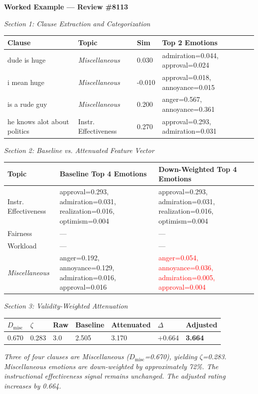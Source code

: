 \documentclass{article}
\begin{document}
\thispagestyle{empty}

\noindent\textbf{Worked Example — Review \#8113}

\vspace{0.5em}
\noindent\textit{Section 1: Clause Extraction and Categorization}

\vspace{0.3em}
\noindent
\begin{tabular}{p{7cm} p{3.5cm} p{1cm} p{5.5cm}}
\toprule
\textbf{Clause} & \textbf{Topic} & \textbf{Sim} & \textbf{Top 2 Emotions} \\
\midrule
dude is huge & \textit{Miscellaneous} & 0.030 & admiration=0.044, approval=0.024 \\
\addlinespace
i mean huge & \textit{Miscellaneous} & -0.010 & approval=0.018, annoyance=0.015 \\
\addlinespace
is a rude guy & \textit{Miscellaneous} & 0.200 & anger=0.567, annoyance=0.361 \\
\addlinespace
he knows alot about politics & Instr. Effectiveness & 0.270 & approval=0.293, admiration=0.031 \\
\bottomrule
\end{tabular}

\vspace{0.8em}
\noindent\textit{Section 2: Baseline vs. Attenuated Feature Vector}

\vspace{0.3em}
\noindent
\begin{tabular}{p{3.5cm} p{7cm} p{7cm}}
\toprule
\textbf{Topic} & \textbf{Baseline Top 4 Emotions} & \textbf{Down-Weighted Top 4 Emotions}  \\
\midrule
Instr. Effectiveness & approval=0.293, admiration=0.031, realization=0.016, optimism=0.004 & approval=0.293, admiration=0.031, realization=0.016, optimism=0.004 \\
\addlinespace
Fairness & — & — \\
\addlinespace
Workload & — & — \\
\addlinespace
\textit{Miscellaneous} & anger=0.192, annoyance=0.129, admiration=0.016, approval=0.016 & \textcolor{red}{anger=0.054, annoyance=0.036, admiration=0.005, approval=0.004} \\
\bottomrule
\end{tabular}

\vspace{0.8em}
\noindent\textit{Section 3: Validity-Weighted Attenuation}

\vspace{0.3em}
\noindent
\begin{tabular}{p{2cm} p{2cm} p{2cm} p{2.5cm} p{2.5cm} p{2cm} p{2.5cm}}
\toprule
$D_{\text{misc}}$ & $\zeta$ & \textbf{Raw} & \textbf{Baseline} & \textbf{Attenuated} & $\Delta$ & \textbf{Adjusted} \\
\midrule
0.670 & 0.283 & 3.0 & 2.505 & 3.170 & +0.664 & \textbf{3.664} \\
\bottomrule
\end{tabular}

\vspace{0.5em}
\small\textit{Three of four clauses are Miscellaneous ($D_{\text{misc}}$=0.670), yielding $\zeta$=0.283. Miscellaneous emotions are down-weighted by approximately 72\%. The instructional effectiveness signal remains unchanged. The adjusted rating increases by 0.664.}
\end{document}

